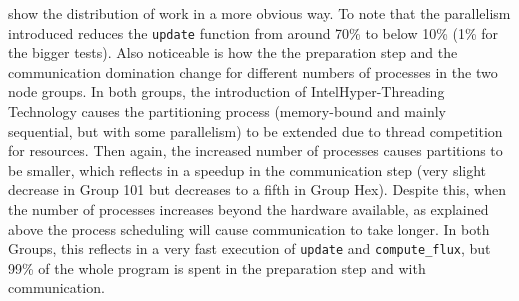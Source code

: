  show the distribution of work in a more obvious way. To note that the parallelism introduced reduces the \texttt{update} function from around 70\% to below 10\% (1\% for the bigger tests). Also noticeable is how the the preparation step and the communication domination change for different numbers of processes in the two node groups. In both groups, the introduction of Intel\textregistered Hyper-Threading Technology causes the partitioning process (memory-bound and mainly sequential, but with some parallelism) to be extended due to thread competition for resources. Then again, the increased number of processes causes partitions to be smaller, which reflects in a speedup in the communication step (very slight decrease in Group 101 but decreases to a fifth in Group Hex). Despite this, when the number of processes increases beyond the hardware available, as explained above the process scheduling will cause communication to take longer. In both Groups, this reflects in a very fast execution of \texttt{update} and \texttt{compute\_flux}, but 99\% of the whole program is spent in the preparation step and with communication.

